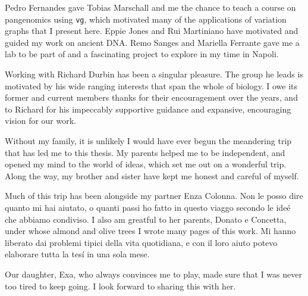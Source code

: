 \begin{acknowledgements}
  Pedro Fernandes gave Tobias Marschall and me the chance to teach a course on pangenomics using {\tt vg}, which motivated many of the applications of variation graphs that I present here.
  Eppie Jones and Rui Martiniano have motivated and guided my work on ancient DNA.
  Remo Sanges and Mariella Ferrante gave me a lab to be part of and a fascinating project to explore in my time in Napoli.
  
  Working with Richard Durbin has been a singular pleasure.
  The group he leads is motivated by his wide ranging interests that span the whole of biology.
  I owe its former and current members thanks for their encouragement over the years, and to Richard for his impeccably supportive guidance and expansive, encouraging vision for our work.

  Without my family, it is unlikely I would have ever begun the meandering trip that has led me to this thesis. 
  My parents helped me to be independent, and opened my mind to the world of ideas, which set me out on a wonderful trip.
  Along the way, my brother and sister have kept me honest and careful of myself.

  Much of this trip has been alongside my partner Enza Colonna.
  Non le posso dire quanto mi hai aiutato, o quanti passi ho fatto in questo viaggo secondo le ideé che abbiamo condiviso.
  I also am greatful to her parents, Donato e Concetta, under whose almond and olive trees I wrote many pages of this work.
  Mi hanno liberato dai problemi tipici della vita quotidiana, e con il loro aiuto potevo elaborare tutta la tesí in una sola mese.
  
  Our daughter, Exa, who always convinces me to play, made sure that I was never too tired to keep going.
  I look forward to sharing this with her.
  

\end{acknowledgements}
